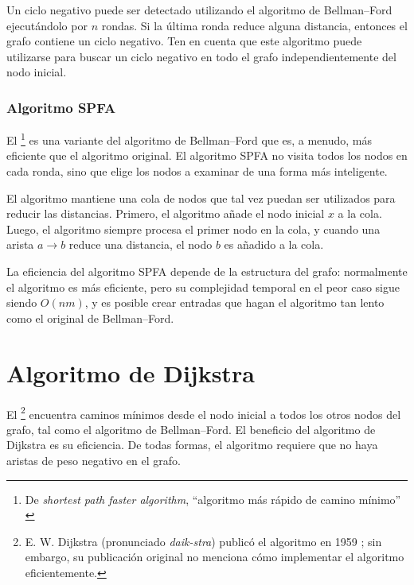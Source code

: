 Un ciclo negativo puede ser detectado utilizando el algoritmo
de Bellman--Ford ejecutándolo por $n$ rondas. Si la última ronda
reduce alguna distancia, entonces el grafo contiene un ciclo negativo.
Ten en cuenta que este algoritmo puede utilizarse para buscar
un ciclo negativo en todo el grafo independientemente del nodo inicial.

\subsubsection{Algoritmo SPFA}


El \footnote{De \textit{shortest path faster algorithm},
    ``algoritmo más rápido de camino mínimo'' \cite{fan94}} es una variante
del algoritmo de Bellman--Ford que es, a menudo, más eficiente que el
algoritmo original. El algoritmo SPFA no visita todos los nodos en cada
ronda, sino que elige los nodos a examinar de una forma más inteligente.

El algoritmo mantiene una cola de nodos que tal vez puedan ser
utilizados para reducir las distancias. Primero, el algoritmo añade
el nodo inicial $x$ a la cola. Luego, el algoritmo siempre procesa
el primer nodo en la cola, y cuando una arista $a \rightarrow b$
reduce una distancia, el nodo $b$ es añadido a la cola.

La eficiencia del algoritmo SPFA depende de la estructura del grafo:
normalmente el algoritmo es más eficiente, pero su complejidad
temporal en el peor caso sigue siendo $O(nm)$, y es posible crear
entradas que hagan el algoritmo tan lento como el original de
Bellman--Ford.

\section{Algoritmo de Dijkstra}


El \footnote{E. W. Dijkstra (pronunciado
    \textit{daik-stra}) publicó el algoritmo en 1959 \cite{dij59};
    sin embargo, su publicación original no menciona cómo implementar
    el algoritmo eficientemente.} encuentra caminos mínimos desde el
nodo inicial a todos los otros nodos del grafo, tal como el algoritmo
de Bellman--Ford. El beneficio del algoritmo de Dijkstra es su eficiencia.
De todas formas, el algoritmo requiere que no haya aristas de peso
negativo en el grafo.

